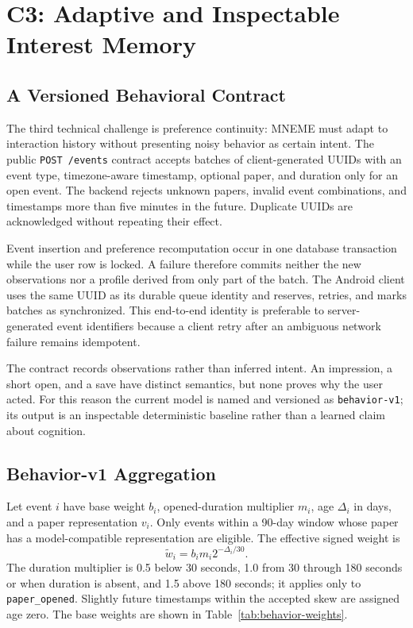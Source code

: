 \section{C3: Adaptive and Inspectable Interest Memory}
\label{sec:c3-behavior}

\subsection{A Versioned Behavioral Contract}

The third technical challenge is preference continuity: MNEME must adapt to interaction history without presenting noisy behavior as certain intent. The public \texttt{POST /events} contract accepts batches of client-generated UUIDs with an event type, timezone-aware timestamp, optional paper, and duration only for an open event. The backend rejects unknown papers, invalid event combinations, and timestamps more than five minutes in the future. Duplicate UUIDs are acknowledged without repeating their effect.

Event insertion and preference recomputation occur in one database transaction while the user row is locked. A failure therefore commits neither the new observations nor a profile derived from only part of the batch. The Android client uses the same UUID as its durable queue identity and reserves, retries, and marks batches as synchronized. This end-to-end identity is preferable to server-generated event identifiers because a client retry after an ambiguous network failure remains idempotent.

The contract records observations rather than inferred intent. An impression, a short open, and a save have distinct semantics, but none proves why the user acted. For this reason the current model is named and versioned as \texttt{behavior-v1}; its output is an inspectable deterministic baseline rather than a learned claim about cognition.

\subsection{Behavior-v1 Aggregation}

Let event \(i\) have base weight \(b_i\), opened-duration multiplier \(m_i\), age \(\Delta_i\) in days, and a paper representation \(v_i\). Only events within a 90-day window whose paper has a model-compatible representation are eligible. The effective signed weight is
\[
  \widetilde{w}_i=b_i m_i 2^{-\Delta_i/30}.
\]
The duration multiplier is 0.5 below 30 seconds, 1.0 from 30 through 180 seconds or when duration is absent, and 1.5 above 180 seconds; it applies only to \texttt{paper\_opened}. Slightly future timestamps within the accepted skew are assigned age zero. The base weights are shown in Table~\ref{tab:behavior-weights}.

